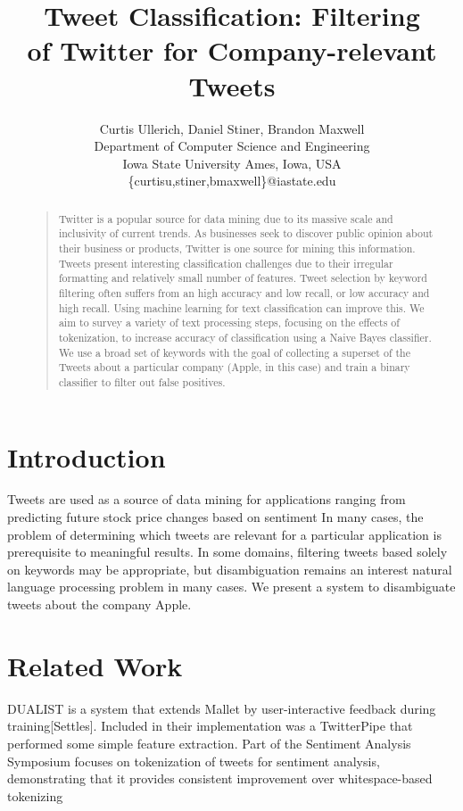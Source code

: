 \documentclass[letterpaper]{article}
\begin{document}
\title{Tweet Classification: Filtering \\ of Twitter for Company-relevant Tweets}
\author{
Curtis Ullerich, Daniel Stiner, Brandon Maxwell\\
Department of Computer Science and Engineering\\
Iowa State University
Ames, Iowa, USA\\
\{curtisu,stiner,bmaxwell\}@iastate.edu\\
}
\maketitle
\begin{abstract}
\begin{quote}
Twitter is a popular source for data mining due to its massive scale and inclusivity of current trends. As businesses seek to discover public opinion about their business or products, Twitter is one source for mining this information. Tweets present interesting classification challenges due to their irregular formatting and relatively small number of features. Tweet selection by keyword filtering often suffers from an high accuracy and low recall, or low accuracy and high recall. Using machine learning for text classification can improve this. We aim to survey a variety of text processing steps, focusing on the effects of tokenization, to increase accuracy of classification using a Naive Bayes classifier. We use a broad set of keywords with the goal of collecting a superset of the Tweets about a particular company (Apple, in this case) and train a binary classifier to filter out false positives.
\end{quote}
\end{abstract}

\section{Introduction}
Tweets are used as a source of data mining for applications ranging from predicting future stock price changes based on sentiment%
In many cases, the problem of determining which tweets are relevant for a particular application is prerequisite to meaningful results. In some domains, filtering tweets based solely on keywords may be appropriate, but disambiguation remains an interest natural language processing problem in many cases. We present a system to disambiguate tweets about the company Apple.

\section{Related Work}
DUALIST is a system that extends Mallet by user-interactive feedback during training[Settles]. Included in their implementation was a TwitterPipe that performed some simple feature extraction. 
Part of the Sentiment Analysis Symposium focuses on tokenization of tweets for sentiment analysis, demonstrating that it provides consistent improvement over whitespace-based tokenizing %
\end{document}
